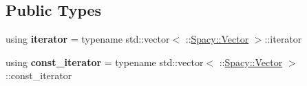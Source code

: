 \subsection*{Public Types}
\begin{DoxyCompactItemize}
\item 
\hypertarget{classSpacy_1_1ProductSpace_1_1Vector_ab7f65b8325dfda9af3ad4446219990e0}{using {\bfseries iterator} = typename std\-::vector$<$ \-::\hyperlink{classSpacy_1_1Vector}{Spacy\-::\-Vector} $>$\-::iterator}\label{classSpacy_1_1ProductSpace_1_1Vector_ab7f65b8325dfda9af3ad4446219990e0}

\item 
\hypertarget{classSpacy_1_1ProductSpace_1_1Vector_a5f2f1a2183b6074971de4ef0284c23e4}{using {\bfseries const\-\_\-iterator} = typename std\-::vector$<$ \-::\hyperlink{classSpacy_1_1Vector}{Spacy\-::\-Vector} $>$\-::const\-\_\-iterator}\label{classSpacy_1_1ProductSpace_1_1Vector_a5f2f1a2183b6074971de4ef0284c23e4}

\end{DoxyCompactItemize}
